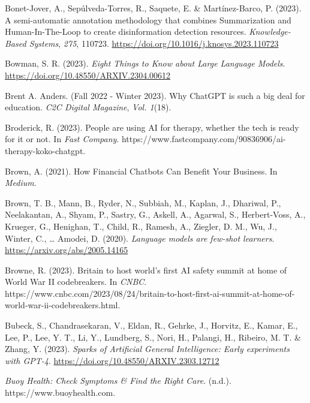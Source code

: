 \documentclass[
  letterpaper,
  DIV=11,
  numbers=noendperiod]{scrartcl}
\newlength{\cslhangindent}
\newenvironment{CSLReferences}[2] %
 {\begin{list}{}{%
  \setlength{\itemindent}{0pt}
  \setlength{\leftmargin}{0pt}
  \setlength{\parsep}{0pt}
  \ifodd #1
   \setlength{\leftmargin}{\cslhangindent}
   \setlength{\itemindent}{-1\cslhangindent}
  \fi
  \setlength{\itemsep}{#2\baselineskip}}}
 {\end{list}}
\begin{document}
\begin{CSLReferences}{1}{0}
Bonet-Jover, A., Sepúlveda-Torres, R., Saquete, E. \& Martínez-Barco, P.
(2023). A semi-automatic annotation methodology that combines
{Summarization} and {Human-In-The-Loop} to create disinformation
detection resources. \emph{Knowledge-Based Systems}, \emph{275}, 110723.
\url{https://doi.org/10.1016/j.knosys.2023.110723}

Bowman, S. R. (2023). \emph{Eight {Things} to {Know} about {Large
Language Models}}. \url{https://doi.org/10.48550/ARXIV.2304.00612}

Brent A. Anders. (Fall 2022 - Winter 2023). Why {ChatGPT} is such a big
deal for education. \emph{C2C Digital Magazine}, \emph{Vol. 1}(18).

Broderick, R. (2023). People are using {AI} for therapy, whether the
tech is ready for it or not. In \emph{Fast Company}.
https://www.fastcompany.com/90836906/ai-therapy-koko-chatgpt.

Brown, A. (2021). How {Financial Chatbots Can Benefit Your Business}. In
\emph{Medium}.

Brown, T. B., Mann, B., Ryder, N., Subbiah, M., Kaplan, J., Dhariwal,
P., Neelakantan, A., Shyam, P., Sastry, G., Askell, A., Agarwal, S.,
Herbert-Voss, A., Krueger, G., Henighan, T., Child, R., Ramesh, A.,
Ziegler, D. M., Wu, J., Winter, C., \ldots{} Amodei, D. (2020).
\emph{Language models are few-shot learners}.
\url{https://arxiv.org/abs/2005.14165}

Browne, R. (2023). Britain to host world's first {AI} safety summit at
home of {World War II} codebreakers. In \emph{CNBC}.
https://www.cnbc.com/2023/08/24/britain-to-host-first-ai-summit-at-home-of-world-war-ii-codebreakers.html.

Bubeck, S., Chandrasekaran, V., Eldan, R., Gehrke, J., Horvitz, E.,
Kamar, E., Lee, P., Lee, Y. T., Li, Y., Lundberg, S., Nori, H., Palangi,
H., Ribeiro, M. T. \& Zhang, Y. (2023). \emph{Sparks of {Artificial
General Intelligence}: {Early} experiments with {GPT-4}}.
\url{https://doi.org/10.48550/ARXIV.2303.12712}

\emph{Buoy {Health}: {Check Symptoms} \& {Find} the {Right Care}}.
(n.d.). https://www.buoyhealth.com.


\end{CSLReferences}
\end{document}
